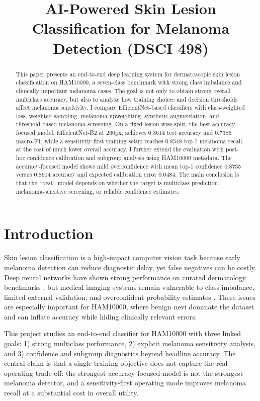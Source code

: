 \documentclass[conference]{IEEEtran}
\title{AI-Powered Skin Lesion Classification for Melanoma Detection (DSCI 498)}
\author{\IEEEauthorblockN{Yue Yu}}
\begin{document}
\maketitle

\begin{abstract}
This paper presents an end-to-end deep learning system for dermatoscopic skin lesion classification on HAM10000, a seven-class benchmark with strong class imbalance and clinically important melanoma cases. The goal is not only to obtain strong overall multiclass accuracy, but also to analyze how training choices and decision thresholds affect melanoma sensitivity. I compare EfficientNet-based classifiers with class-weighted loss, weighted sampling, melanoma upweighting, synthetic augmentation, and threshold-based melanoma screening. On a fixed lesion-wise split, the best accuracy-focused model, EfficientNet-B2 at 260px, achieves 0.8614 test accuracy and 0.7386 macro-F1, while a sensitivity-first training setup reaches 0.8548 top-1 melanoma recall at the cost of much lower overall accuracy. I further extend the evaluation with post-hoc confidence calibration and subgroup analysis using HAM10000 metadata. The accuracy-focused model shows mild overconfidence with mean top-1 confidence 0.8735 versus 0.8614 accuracy and expected calibration error 0.0484. The main conclusion is that the ``best'' model depends on whether the target is multiclass prediction, melanoma-sensitive screening, or reliable confidence estimates.
\end{abstract}

\section{Introduction}
Skin lesion classification is a high-impact computer vision task because early melanoma detection can reduce diagnostic delay, yet false negatives can be costly. Deep neural networks have shown strong performance on curated dermatology benchmarks \cite{esteva2017dermatologist}, but medical imaging systems remain vulnerable to class imbalance, limited external validation, and overconfident probability estimates \cite{tschandl2018ham10000,melo2025systematic}. These issues are especially important for HAM10000, where benign nevi dominate the dataset and can inflate accuracy while hiding clinically relevant errors.

This project studies an end-to-end classifier for HAM10000 with three linked goals: 1) strong multiclass performance, 2) explicit melanoma sensitivity analysis, and 3) confidence and subgroup diagnostics beyond headline accuracy. The central claim is that a single training objective does not capture the real operating trade-off: the strongest accuracy-focused model is not the strongest melanoma detector, and a sensitivity-first operating mode improves melanoma recall at a substantial cost in overall utility.
\end{document}
